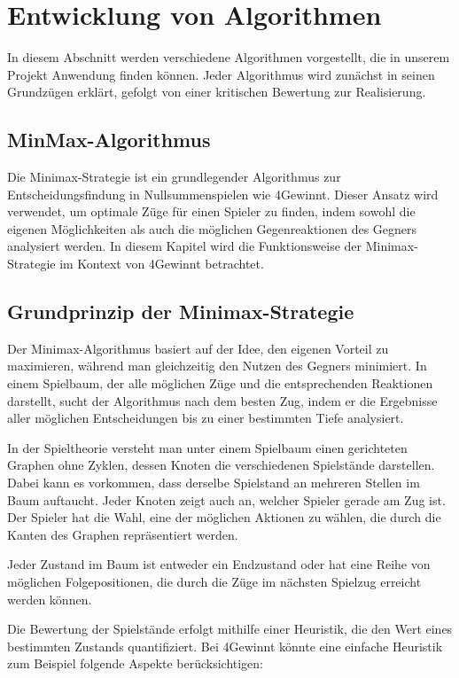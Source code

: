 	
\section{Entwicklung von Algorithmen}
In diesem Abschnitt werden verschiedene Algorithmen vorgestellt, die in unserem Projekt Anwendung finden können. Jeder Algorithmus wird zunächst in seinen Grundzügen erklärt, gefolgt von einer kritischen Bewertung zur Realisierung.
	
\subsection{MinMax-Algorithmus}

Die Minimax-Strategie ist ein grundlegender Algorithmus zur Entscheidungsfindung in Nullsummenspielen wie 4Gewinnt. Dieser Ansatz wird verwendet, um optimale Züge für einen Spieler zu finden, indem sowohl die eigenen Möglichkeiten als auch die möglichen Gegenreaktionen des Gegners analysiert werden. In diesem Kapitel wird die Funktionsweise der Minimax-Strategie im Kontext von 4Gewinnt betrachtet.

\subsection*{Grundprinzip der Minimax-Strategie}

Der Minimax-Algorithmus basiert auf der Idee, den eigenen Vorteil zu maximieren, während man gleichzeitig den Nutzen des Gegners minimiert. In einem Spielbaum, der alle möglichen Züge und die entsprechenden Reaktionen darstellt, sucht der Algorithmus nach dem besten Zug, indem er die Ergebnisse aller möglichen Entscheidungen bis zu einer bestimmten Tiefe analysiert.

In der Spieltheorie versteht man unter einem Spielbaum einen gerichteten Graphen ohne Zyklen, dessen Knoten die verschiedenen Spielstände darstellen. Dabei kann es vorkommen, dass derselbe Spielstand an mehreren Stellen im Baum auftaucht. Jeder Knoten zeigt auch an, welcher Spieler gerade am Zug ist. Der Spieler hat die Wahl, eine der möglichen Aktionen zu wählen, die durch die Kanten des Graphen repräsentiert werden.

Jeder Zustand im Baum ist entweder ein Endzustand oder hat eine Reihe von möglichen Folgepositionen, die durch die Züge im nächsten Spielzug erreicht werden können.

Die Bewertung der Spielstände erfolgt mithilfe einer Heuristik, die den Wert eines bestimmten Zustands quantifiziert. Bei 4Gewinnt könnte eine einfache Heuristik zum Beispiel folgende Aspekte berücksichtigen:

